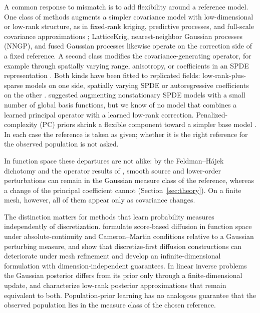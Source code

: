 \documentclass[11pt]{article}
\numberwithin{table}{section}
\numberwithin{figure}{section}
\begin{document}
A common response to mismatch is to add flexibility around a reference model. One class of methods augments a simpler covariance model with low-dimensional or low-rank structure, as in fixed-rank kriging, predictive processes, and full-scale covariance approximations \citep{CressieJohannesson2008,Banerjee2008,SangHuang2012}; LatticeKrig, nearest-neighbor Gaussian processes (NNGP), and fused Gaussian processes likewise operate on the correction side of a fixed reference. A second class modifies the covariance-generating operator, for example through spatially varying range, anisotropy, or coefficients in an SPDE representation \citep{Fuglstad2015,LindgrenBolinRue2022}. Both kinds have been fitted to replicated fields: low-rank-plus-sparse models \citep{Krock2021,LeDuc2026} on one side, spatially varying SPDE or autoregressive coefficients on the other \citep{Ingebrigtsen2015,Wiens2020,Sikorski2025}. \citet{Fuglstad2015} suggested augmenting nonstationary SPDE models with a small number of global basis functions, but we know of no model that combines a learned principal operator with a learned low-rank correction. Penalized-complexity (PC) priors shrink a flexible component toward a simpler base model \citep{Simpson2017,Fuglstad2019}. In each case the reference is taken as given; whether it is the right reference for the observed population is not asked.

In function space these departures are not alike: by the Feldman--H\'ajek dichotomy and the operator results of \citet{BolinKirchner2023}, smooth source and lower-order perturbations can remain in the Gaussian measure class of the reference, whereas a change of the principal coefficient cannot (Section~\ref{sec:theory}). On a finite mesh, however, all of them appear only as covariance changes.

The distinction matters for methods that learn probability measures independently of discretization. \citet{Lim2025} formulate score-based diffusion in function space under absolute-continuity and Cameron--Martin conditions relative to a Gaussian perturbing measure, and \citet{Pidstrigach2024} show that discretize-first diffusion constructions can deteriorate under mesh refinement and develop an infinite-dimensional formulation with dimension-independent guarantees. In linear inverse problems the Gaussian posterior differs from its prior only through a finite-dimensional update, and \citet{CarereLie2026} characterize low-rank posterior approximations that remain equivalent to both. Population-prior learning has no analogous guarantee that the observed population lies in the measure class of the chosen reference.
\end{document}
